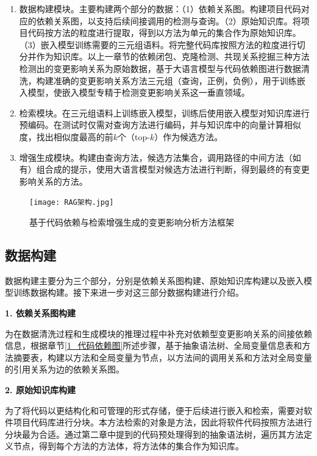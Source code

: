 \begin{enumerate}

    \item 数据构建模块。主要构建两个部分的数据：（1）依赖关系图。构建项目代码对应的依赖关系图，以支持后续间接调用的检测与查询。（2）原始知识库。将项目代码按方法的粒度进行提取，得到以方法为单元的集合作为原始知识库。（3）嵌入模型训练需要的三元组语料。将完整代码库按照方法的粒度进行切分并作为知识库。以上一章节的依赖闭包、克隆检测、共现关系挖掘三种方法检测出的变更影响关系为原始数据，基于大语言模型与代码依赖图进行数据清洗，构建准确的变更影响关系方法三元组（查询，正例，负例），用于训练嵌入模型，使嵌入模型专精于检测变更影响关系这一垂直领域。

    \item 检索模块。在三元组语料上训练嵌入模型，训练后使用嵌入模型对知识库进行预编码。在测试时仅需对查询方法进行编码，并与知识库中的向量计算相似度，找出相似度最高的前$k$个（top-$k$）作为候选方法。
    
    \item 增强生成模块。构建由查询方法，候选方法集合，调用路径的中间方法（如有）组合成的提示，使用大语言模型对候选方法进行判断，得到最终的有变更影响关系的方法。
    
\end{enumerate}

\begin{figure}[htbp]
\centering
\texttt{[image: RAG架构.jpg]}
\caption{基于代码依赖与检索增强生成的变更影响分析方法框架}
\label{2_基于代码依赖与检索增强生成的变更影响分析方法框架}
\end{figure}


\subsection{数据构建}
\label{3_数据构建}

数据构建主要分为三个部分，分别是依赖关系图构建、原始知识库构建以及嵌入模型训练数据构建。接下来进一步对这三部分数据构建进行介绍。

\noindent \textbf{1. 依赖关系图构建}

为在数据清洗过程和生成模块的推理过程中补充对依赖型变更影响关系的间接依赖信息，根据章节\ref{1_代码依赖图}所述步骤，基于抽象语法树、全局变量信息表和方法摘要表，构建以方法和全局变量为节点，以方法间的调用关系和方法对全局变量的引用关系为边的依赖关系图。

\noindent \textbf{2. 原始知识库构建}

为了将代码以更结构化和可管理的形式存储，便于后续进行嵌入和检索，需要对软件项目代码库进行分块。本方法检索的对象是方法，因此将软件代码按照方法进行分块最为合适。通过第二章中提到的代码预处理得到的抽象语法树，遍历其方法定义节点，得到每个方法的方法体，将方法体的集合作为知识库。


